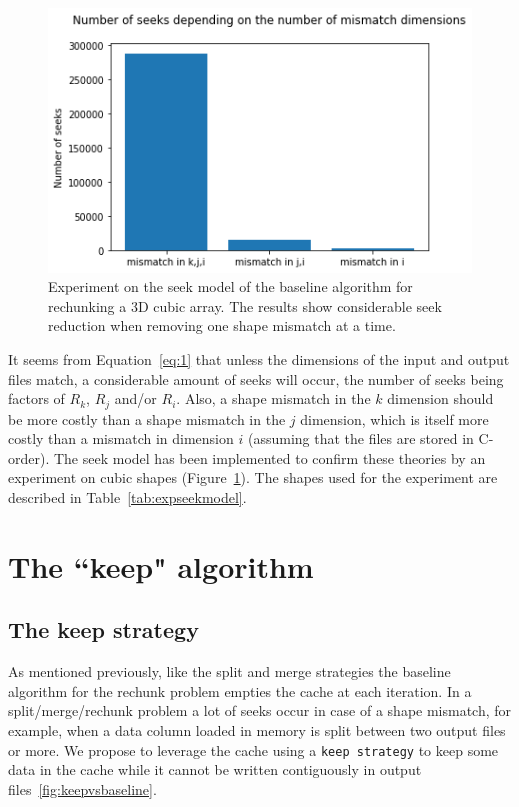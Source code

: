 \documentclass[conference]{IEEEtran}
\begin{document}
\begin{figure}[h]
\centering
\includegraphics[scale=0.55]{./figures/baseline_math_model.png}
\caption{Experiment on the seek model of the baseline algorithm for rechunking a 3D cubic array.
The results show considerable seek reduction when removing one shape mismatch at a time.
}
\label{fig:baseline_math_model}
\end{figure}

It seems from Equation~\ref{eq:1} that unless the dimensions of the input and
output files match, a considerable amount of seeks will occur, the number of
seeks being factors of $R_k$, $R_j$ and/or $R_i$. Also, a shape mismatch in the
$k$ dimension should be more costly than a shape mismatch in the $j$ dimension,
which is itself more costly than a mismatch in dimension $i$ (assuming that the
files are stored in C-order). The seek model has been implemented to confirm
these theories by an experiment on cubic shapes
(Figure~\ref{fig:baseline_math_model}). The shapes used for the experiment are
described in Table~\ref{tab:expseekmodel}.

\section{The ``keep" algorithm}

\subsection{The keep strategy}

As mentioned previously, like the split and merge strategies the baseline
algorithm for the rechunk problem empties the cache at each iteration. In a
split/merge/rechunk problem a lot of seeks occur in case of a shape mismatch,
for example, when a data column loaded in memory is split between two output
files or more. We propose to leverage the cache using a \texttt{keep strategy}
to keep some data in the cache while it cannot be written contiguously in output
files~\ref{fig:keepvsbaseline}.
\end{document}
